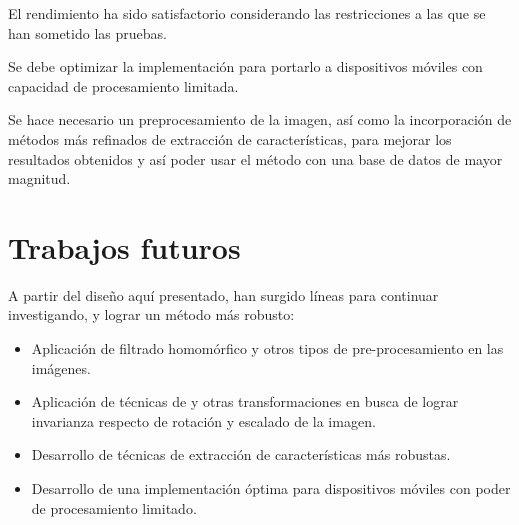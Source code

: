 \documentclass[conference,spanish,a4paper,10pt,oneside,final]{tfmpd}
\begin{document}
El rendimiento ha sido satisfactorio considerando las restricciones a las
que se han sometido las pruebas.

Se debe optimizar la implementación para portarlo a dispositivos móviles
con capacidad de procesamiento limitada.

Se hace necesario un preprocesamiento de la imagen, así como la incorporación
de métodos más refinados de extracción de características, para mejorar los
resultados obtenidos y así poder usar el método con una base de datos de
mayor magnitud.
%
%
%
%
\section{Trabajos futuros}
A partir del diseño aquí presentado, han surgido líneas para continuar investigando, 
y lograr un método más robusto:
\begin{itemize}
\item Aplicación de filtrado homomórfico y otros tipos de
      pre-procesamiento en las imágenes.
\item Aplicación de técnicas de  y otras transformaciones en busca
      de lograr invarianza respecto de rotación y escalado de la imagen.
\item Desarrollo de técnicas de extracción de características más robustas.
\item Desarrollo de una implementación óptima para dispositivos móviles con
      poder de procesamiento limitado.
\end{itemize}
\nocite{*}


\end{document}

